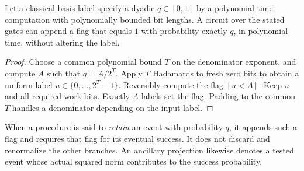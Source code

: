\begin{lemma}\label{lem:dyadic}
Let a classical basis label specify a dyadic $q\in[0,1]$ by a polynomial-time computation with polynomially bounded bit lengths. A circuit over the stated gates can append a flag that equals $1$ with probability exactly $q$, in polynomial time, without altering the label.
\end{lemma}
\begin{proof}
Choose a common polynomial bound $T$ on the denominator exponent, and compute $A$ such that $q=A/2^T$. Apply $T$ Hadamards to fresh zero bits to obtain a uniform label $u\in\{0,\ldots,2^T-1\}$. Reversibly compute the flag $[u<A]$. Keep $u$ and all required work bits. Exactly $A$ labels set the flag. Padding to the common $T$ handles a denominator depending on the input label.
\end{proof}

When a procedure is said to \emph{retain} an event with probability $q$, it appends such a flag and requires that flag for its eventual success. It does not discard and renormalize the other branches. An ancillary projection likewise denotes a tested event whose actual squared norm contributes to the success probability.


